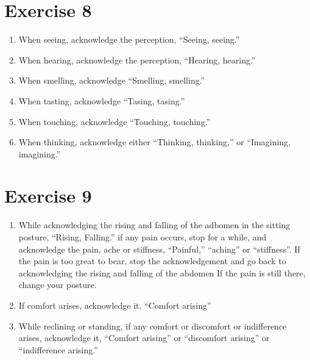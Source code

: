 \documentclass[a5paper,10pt,english]{book}
\begin{document}
\section{Exercise 8}
\label{\detokenize{practice:exercise-8}}\begin{enumerate}
%
\item {} 
\sphinxAtStartPar
When seeing, acknowledge the perception, “Seeing, seeing.”

\item {} 
\sphinxAtStartPar
When hearing, acknowledge the perception, “Hearing, hearing.”

\item {} 
\sphinxAtStartPar
When smelling, acknowledge “Smelling, smelling.”

\item {} 
\sphinxAtStartPar
When tasting, acknowledge “Tasing, tasing.”

\item {} 
\sphinxAtStartPar
When touching, acknowledge “Touching, touching.”

\item {} 
\sphinxAtStartPar
When thinking, acknowledge either “Thinking, thinking,” or “Imagining, imagining.”

\end{enumerate}


\section{Exercise 9}
\label{\detokenize{practice:exercise-9}}\begin{enumerate}
%
\item {} 
\sphinxAtStartPar
While acknowledging the rising and falling of the adbomen in the sitting posture, “Rising, Falling.” if any pain occurs, stop for a while, and acknowledge the pain, ache or stiffness, “Painful,” “aching” or “stiffness”. If the pain is too great to bear, stop the acknowledgement and go back to acknowledging the rising and falling of the abdomen If the pain is still there, change your posture.

\item {} 
\sphinxAtStartPar
If comfort arises, acknowledge it, “Comfort arising”

\item {} 
\sphinxAtStartPar
While reclining or standing, if any comfort or discomfort or indifference arises, acknowledge it, “Comfort arising” or “discomfort arising” or “indifference arising.”

\end{enumerate}
\end{document}
